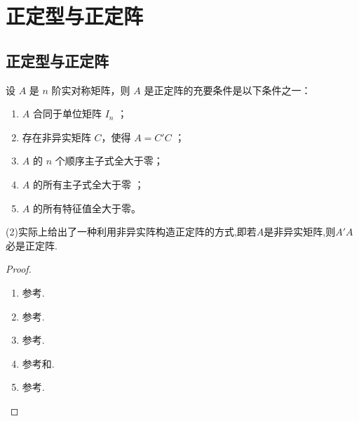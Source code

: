 \documentclass[../../main.tex]{subfiles}%
\begin{document}
\section{正定型与正定阵}

\subsection{正定型与正定阵}

\begin{theorem}[正定阵的判定准则]\label{theorem:正定阵的判定准则}
设 $A$ 是 $n$ 阶实对称矩阵，则 $A$ 是正定阵的充要条件是以下条件之一：
\begin{enumerate}[(1)]
\item $A$ 合同于单位矩阵 $I_n$ ；

\item 存在非异实矩阵 $C$，使得 $A = C'C$ ；

\item $A$ 的 $n$ 个顺序主子式全大于零；

\item $A$ 的所有主子式全大于零 ；

\item $A$ 的所有特征值全大于零。
\end{enumerate} 
\end{theorem}
\begin{remark}
(2)实际上给出了一种利用非异实阵构造正定阵的方式,即若$A$是非异实矩阵,则$A'A$必是正定阵.
\end{remark}
\begin{proof}
\begin{enumerate}[(1)]
\item 参考.

\item 参考.

\item 参考.

\item 参考和.

\item 参考.
\end{enumerate}
\end{proof}
\end{document}
